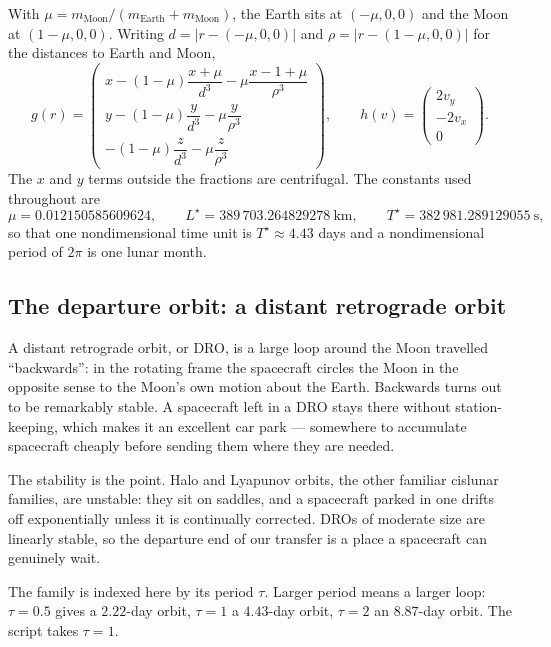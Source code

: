 \documentclass[11pt]{article}
\begin{document}
\begin{rig}
With $\mu = m_{\text{Moon}}/(m_{\text{Earth}} + m_{\text{Moon}})$, the Earth
sits at $(-\mu, 0, 0)$ and the Moon at $(1-\mu, 0, 0)$. Writing
$d = |r - (-\mu, 0, 0)|$ and $\rho = |r - (1-\mu, 0, 0)|$ for the distances to
Earth and Moon,
\begin{equation}\label{eq:grav}
g(r) = \begin{pmatrix}
x - (1-\mu)\dfrac{x+\mu}{d^3} - \mu\dfrac{x-1+\mu}{\rho^3} \\[2mm]
y - (1-\mu)\dfrac{y}{d^3} - \mu\dfrac{y}{\rho^3} \\[2mm]
- (1-\mu)\dfrac{z}{d^3} - \mu\dfrac{z}{\rho^3}
\end{pmatrix},
\qquad
h(v) = \begin{pmatrix} 2v_y \\ -2v_x \\ 0 \end{pmatrix}.
\end{equation}
The $x$ and $y$ terms outside the fractions are centrifugal. The constants
used throughout are
\[
\mu = 0.012150585609624, \qquad
L^\star = 389\,703.264829278~\text{km}, \qquad
T^\star = 382\,981.289129055~\text{s},
\]
so that one nondimensional time unit is $T^\star \approx 4.43$ days and a
nondimensional period of $2\pi$ is one lunar month.
\end{rig}

\subsection{The departure orbit: a distant retrograde orbit}

\begin{eli}
A distant retrograde orbit, or DRO, is a large loop around the Moon travelled
``backwards'': in the rotating frame the spacecraft circles the Moon in the
opposite sense to the Moon's own motion about the Earth. Backwards turns out to
be remarkably stable. A spacecraft left in a DRO stays there without
station-keeping, which makes it an excellent car park --- somewhere to
accumulate spacecraft cheaply before sending them where they are needed.
\end{eli}

\begin{intu}
The stability is the point. Halo and Lyapunov orbits, the other familiar
cislunar families, are unstable: they sit on saddles, and a spacecraft parked
in one drifts off exponentially unless it is continually corrected. DROs of
moderate size are linearly stable, so the departure end of our transfer is a
place a spacecraft can genuinely wait.

The family is indexed here by its period $\tau$. Larger period means a larger
loop: $\tau = 0.5$ gives a $2.22$-day orbit, $\tau = 1$ a $4.43$-day orbit,
$\tau = 2$ an $8.87$-day orbit. The script takes $\tau = 1$.
\end{intu}
\end{document}
